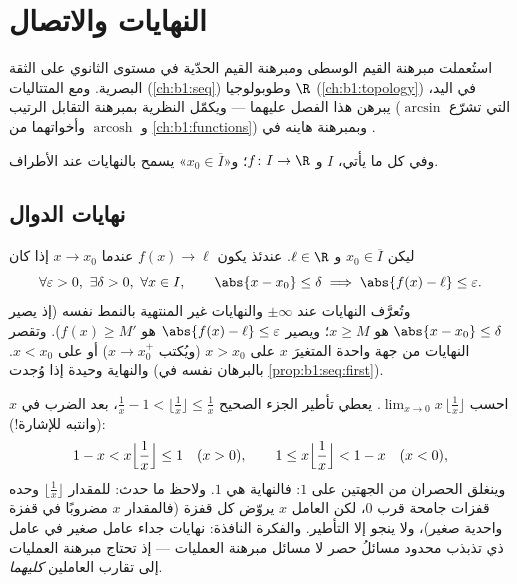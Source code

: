 \chapter{النهايات والاتصال}\label{ch:b1:continuity}

استُعملت مبرهنة القيم الوسطى ومبرهنة القيم الحدّية
في مستوى الثانوي على الثقة البصرية. ومع المتتاليات
(\cref{ch:b1:seq}) وطوبولوجيا $\R$ (\cref{ch:b1:topology})
في اليد، يبرهن هذا الفصل عليهما --- ويكمّل النظرية
بمبرهنة التقابل الرتيب (التي تشرّع $\arcsin$ و
$\operatorname{arcosh}$ وأخواتهما من \cref{ch:b1:functions})
وبمبرهنة هاينه في .

وفي كل ما يأتي، $I$  و $f \colon I \to \R$؛ و«$x_0 \in
\overline I$» يسمح بالنهايات عند الأطراف.

\section{نهايات الدوال}

\begin{definition}\label{def:b1:continuity:limit}
ليكن $x_0 \in \overline{I}$ و $\ell \in \R$. عندئذ يكون $f(x) \to \ell$ عندما
$x \to x_0$ إذا كان
\[
\forall \varepsilon > 0,\ \exists \delta > 0,\ \forall x \in I,
\qquad \abs{x - x_0} \leq \delta \implies \abs{f(x) - \ell} \leq
\varepsilon .
\]
وتُعرَّف النهايات عند $\pm\infty$ والنهايات
غير المنتهية بالنمط نفسه (إذ يصير $\abs{x - x_0} \leq \delta$ هو $x \geq M$؛ ويصير $\abs{f(x) -
\ell} \leq \varepsilon$ هو $f(x) \geq M'$). وتقصر النهايات من جهة واحدة
المتغيرَ $x$ على $x > x_0$ (ويُكتب $x \to x_0^+$) أو على $x < x_0$. والنهاية
وحيدة إذا وُجدت (بالبرهان نفسه في
\cref{prop:b1:seq:first}).
\end{definition}

\begin{example}\label{ex:b1:continuity:floorlimit}
احسب $\lim_{x \to 0} x\,\bigl\lfloor \frac1x \bigr\rfloor$.
يعطي تأطير الجزء الصحيح $\frac1x - 1 < \lfloor \frac1x \rfloor \leq
\frac1x$، بعد الضرب في $x$ (وانتبه للإشارة!):
\[
1 - x < x\Bigl\lfloor \frac1x \Bigr\rfloor \leq 1 \quad (x > 0),
\qquad
1 \leq x\Bigl\lfloor \frac1x \Bigr\rfloor < 1 - x \quad (x < 0),
\]
وينغلق الحصران من الجهتين على $1$: فالنهاية هي $1$. ولاحظ
ما حدث: للمقدار $\lfloor \frac1x\rfloor$ وحده قفزات جامحة قرب
$0$، لكن العامل $x$ يروّض كل قفزة (فالمقدار $x$ مضروبًا في قفزة واحدية
صغير)، ولا ينجو إلا التأطير. والفكرة النافذة:
نهايات جداء عامل صغير في عامل ذي تذبذب
محدود مسائلُ حصر لا مسائل مبرهنة العمليات ---
إذ تحتاج مبرهنة العمليات إلى تقارب العاملين \emph{كليهما}.
\end{example}

